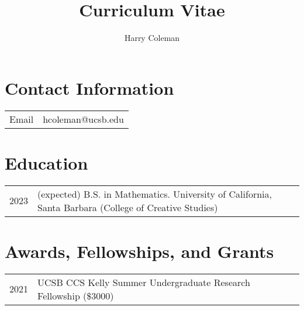 \documentclass[12pt]{article}
\newcommand{\yitem}[2]{#1 & \begin{minipage}[t]{\textwidth} #2 \end{minipage}}
\begin{document}
\title{\vspace{-1cm}Curriculum Vitae}
\author{Harry Coleman}
\date{}
\maketitle

\section*{Contact Information}

\begin{tabularx}{\textwidth}{ll}
    Email & hcoleman@ucsb.edu
\end{tabularx}

\section*{Education}

\begin{tabularx}{\textwidth}{lX}
    2023 & (expected) B.S. in Mathematics. University of California, Santa Barbara (College of Creative Studies)
\end{tabularx}

\section*{Awards, Fellowships, and Grants}

\begin{tabularx}{\textwidth}{ll}
    \yitem{2021}{UCSB CCS Kelly Summer Undergraduate Research Fellowship (\$3000)}
\end{tabularx}
\end{document}
